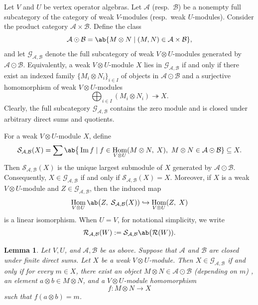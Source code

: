 \documentclass[12pt, english]{article}
\numberwithin{equation}{section}
\DeclareMathOperator{\Hom}{Hom}
\DeclareMathOperator{\Image}{Im}
\theoremstyle{plain}
\newtheorem{lemma}{Lemma}[section]
\theoremstyle{definition}
\theoremstyle{remark}
\begin{document}
	
	
	\vspace{0.2cm}
	
	Let $V$ and $U$ be vertex operator algebras.
	Let $\mathcal{A}$ (resp.\ $\mathcal{B}$) be a nonempty full subcategory of the category of weak $V$-modules (resp.\ weak $U$-modules).
	Consider the product category $\mathcal{A} \times \mathcal{B}$.
	Define the class
	\[
	\mathcal{A} \odot \mathcal{B} = \ab\{ M\otimes N \mid (M, N) \in \mathcal{A}\times\mathcal{B} \},
	\]
	and let $\mathcal{G}_{\mathcal{A}, \mathcal{B}}$  denote the full subcategory of weak $V\otimes U$-modules generated by $\mathcal{A} \odot \mathcal{B}$.
	Equivalently, a weak $V\otimes U$-module $X$ lies in $\mathcal{G}_{\mathcal{A}, \mathcal{B}}$  if and only if there exist an indexed family $\{M_i \otimes N_i\}_{i \in I}$ of objects in $\mathcal{A} \odot \mathcal{B}$ and a surjective homomorphism of weak $V\otimes U$-modules
	\[
	\bigoplus_{i \in I} (M_i\otimes N_i) \twoheadrightarrow X.
	\]
	Clearly,  the full subcategory $\mathcal{G}_{\mathcal{A}, \mathcal{B}}$ contains the zero module and is closed under arbitrary direct sums and quotients.
	
	
	For a weak $V\otimes U$-module $X$, define
	\[
	\mathcal{S}_{\mathcal{A}, \mathcal{B}}(X)
	= \sum \ab\big\{ \Image f \mid f \in \Hom_{V\otimes U}(M\otimes N, \; X), \ M\otimes N \in \mathcal{A} \odot \mathcal{B} \}
	\subseteq X.
	\]
	Then $\mathcal{S}_{\mathcal{A}, \mathcal{B}}(X)$ is the unique largest submodule of $X$ generated by $\mathcal{A} \odot \mathcal{B}$.
	Consequently, $X \in \mathcal{G}_{\mathcal{A}, \mathcal{B}}$ if and only if $\mathcal{S}_{\mathcal{A}, \mathcal{B}}(X) = X$.
	Moreover, if $X$ is a weak $V\otimes U$-module and $Z \in \mathcal{G}_{\mathcal{A}, \mathcal{B}}$, then the induced map
	\begin{equation}
		\Hom_{V \otimes U} \ab\big(Z, \; \mathcal{S}_{\mathcal{A}, \mathcal{B}}(X)) \hookrightarrow \Hom_{V \otimes U} (Z, \; X)
	\end{equation}
	is a linear isomorphism.
	When $U = V$, for notational simplicity, we write
	\[
	\mathcal{R}_{\mathcal{A}, \mathcal{B}}(W)
	:=
	\mathcal{S}_{\mathcal{A}, \mathcal{B}} \ab\big(\mathcal{R}(W)).
	\]
	
	
	
	\begin{lemma} \label{lem:pure-tensor-presentation}
		Let $V, U$, and $\mathcal{A}, \mathcal{B}$ be as above.
		Suppose that $\mathcal{A}$ and $\mathcal{B}$ are closed under finite direct sums.
		Let $X$ be a weak $V\otimes U$-module.
		Then $X \in \mathcal{G}_{\mathcal{A}, \mathcal{B}}$ if and only if for every $m \in X$,
		there exist an object $M \otimes N \in \mathcal{A} \odot \mathcal{B}$ (depending on $m$) , an element $ a \otimes b \in M \otimes N$, and a $V \otimes U$-module homomorphism
		\[
		f\colon M \otimes N \longrightarrow X
		\]
		such that $f(a \otimes b) = m$.
		
	\end{lemma}
	
\end{document}
